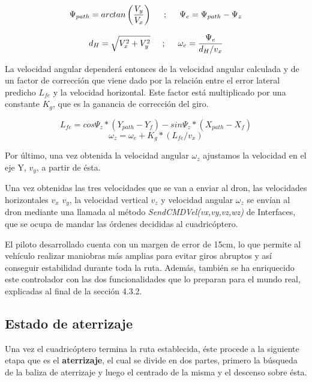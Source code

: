 \[\Psi_{path} = arctan \left(\frac{V_{y}}{V_{x}}\right)  \hspace{0.5cm};\hspace{0.5cm}\Psi_{e} = \Psi_{path} - \Psi_{z} \]

\[d_{H} = \sqrt{V_{x}^{2} + V_{y}^{2}} \hspace{0.5cm};\hspace{0.5cm} \omega_{e} =  \dfrac{\Psi_{e}}{d_{H}/v_{x}}\]

\hspace{1cm} La velocidad angular dependerá entonces de la velocidad angular calculada y de un factor de corrección que viene dado por la relación entre el error lateral predicho $L_{fe}$ y la velocidad horizontal. Este factor está multiplicado por una constante $K_{g}$, que es la ganancia de corrección del giro.

\[ L_{fe} = cos\Psi_{z}*(Y_{path}-Y_{f}) - sin\Psi_{z}*(X_{path}-X_{f}) \]
\[ \omega_{z} = \omega_{e} + K_{g} * (L_{fe}/v_{x})\]

\hspace{1cm} Por último, una vez obtenida la velocidad angular $\omega_{z}$ ajustamos la velocidad en el eje Y, $v_{y}$, a partir de ésta.

\hspace{1cm} Una vez obtenidas las tres velocidades que se van a enviar al dron, las velocidades horizontales $v_{x}$ $v_{y}$, la velocidad vertical $v_{z}$ y velocidad angular $\omega_{z}$ se envían al dron mediante una llamada al método \textit{SendCMDVel(vx,vy,vz,wz)} de Interfaces, que se ocupa de mandar las órdenes decididas al cuadricóptero.

\hspace{1cm} El piloto desarrollado cuenta con un margen de error de 15cm, lo que permite al vehículo realizar maniobras más amplias para evitar giros abruptos y así conseguir estabilidad durante toda la ruta. Además, también se ha enriquecido este controlador con las dos funcionalidades que lo preparan para el mundo real, explicadas al final de la sección 4.3.2.
\\

\subsection{Estado de aterrizaje}
\hspace{1cm} Una vez el cuadricóptero termina la ruta establecida, éste procede a la siguiente etapa que es el \textbf{aterrizaje}, el cual se divide en dos partes, primero la búsqueda de la baliza de aterrizaje y luego el centrado de la misma y el descenso sobre ésta. 

